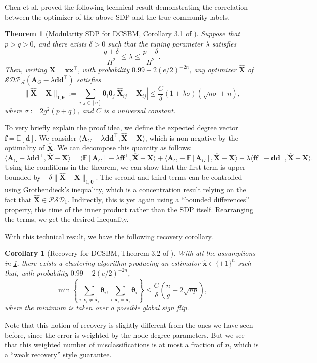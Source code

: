 \documentclass[11pt, titlepage]{article} %
\numberwithin{equation}{section}
\newtheorem{theorem}{Theorem}
\newtheorem{corollary}{Corollary}
\theoremstyle{definition}
\numberwithin{theorem}{section}
\numberwithin{lemma}{section}
\numberwithin{corollary}{section}
\numberwithin{proposition}{section}
\numberwithin{definition}{section}
\numberwithin{remark}{section}
\begin{document}
Chen et al. \cite{CLX18} proved the following technical result demonstrating the correlation between
the optimizer of the above SDP and the true community labels.
\begin{theorem}[Modularity SDP for DCSBM, Corollary 3.1 of \cite{CLX18}]
\label{thm:CLX18}
Suppose that $p > q > 0$, and there exists $\delta > 0$ such that the tuning parameter $\lambda$ satisfies
\[
\frac{q + \delta}{H^2} \leq \lambda \leq \frac{p - \delta}{H^2}.
\]
Then, writing $\bm{X} = \bm{x}\bm{x}^\top$, with probability $0.99 - 2(e/2)^{-2n}$, any optimizer 
$\hat{\bm{X}}$ of $\mathcal{SDP}_\mathcal{A}(\bm{A}_G - \lambda \bm{d}\bm{d}^\top)$ satisfies
\[
\|\hat{\bm{X}} - \bm{X}\|_{1, \bm{\theta}} := 
\sum_{i, j \in [n]}\bm{\theta}_i\bm{\theta}_j|\hat{\bm{X}}_{ij} - \bm{X}_{ij}| 
\leq \frac{C}{\delta}(1 + \lambda \sigma)(\sqrt{n\sigma}+n),
\]
where $\sigma := 2g^2(p + q)$, and $C$ is a universal constant.
\end{theorem}
To very briefly explain the proof idea, we define the expected degree vector $\bm{f} = \mathbb{E}[\bm{d}]$.
We consider $\langle \bm{A}_G - \lambda \bm{d}\bm{d}^\top, \hat{\bm{X}} - \bm{X} \rangle$, which is 
non-negative by the optimality of $\hat{\bm{X}}$. We can decompose this quantity as follows:
\[
\langle \bm{A}_G - \lambda \bm{d}\bm{d}^\top, \hat{\bm{X}} - \bm{X} \rangle
= \langle \mathbb{E}[\bm{A}_G] - \lambda \bm{f}\bm{f}^\top, \hat{\bm{X}} - \bm{X} \rangle 
+ \langle \bm{A}_G - \mathbb{E}[\bm{A}_G], \hat{\bm{X}} - \bm{X} \rangle
+ \lambda \langle \bm{f}\bm{f}^\top - \bm{d}\bm{d}^\top, \hat{\bm{X}} - \bm{X} \rangle.
\]
Using the conditions in the theorem, we can show that the first term is upper bounded by
$-\delta \|\hat{\bm{X}} - \bm{X}\|_{1, \bm{\theta}}$. The second and third terms can be controlled
using Grothendieck's inequality, which is a concentration result relying on the fact that 
$\hat{\bm{X}} \in \mathcal{PSD}_1$. Indirectly, this is yet again using a ``bounded 
differences'' property, this time of the inner product rather than the SDP itself. 
Rearranging the terms, we get the desired inequality.

With this technical result, we have the following recovery corollary.
\begin{corollary}[Recovery for DCSBM, Theorem 3.2 of \cite{CLX18}]
With all the assumptions in \cref{thm:CLX18}, there exists a clustering algorithm producing an 
estimator $\hat{\bm{x}} \in \{\pm 1\}^n$ such that, with probability $0.99 - 2(e/2)^{-2n}$,
\[
\min \left\{\sum_{i: \bm{x}_i \neq \hat{\bm{x}}_i} \bm{\theta}_i, \sum_{i: \bm{x}_i = \hat{\bm{x}}_i} \bm{\theta}_i \right\} 
\leq \frac{C}{\delta} \left(\frac{n}{g} + 2\sqrt{np}\right),
\]
where the minimum is taken over a possible global sign flip.
\end{corollary}
Note that this notion of recovery is slightly different from the ones we have seen before, since
the error is weighted by the node degree parameters. But we see that this weighted number of 
misclassifications is at most a fraction of $n$, which is a ``weak recovery'' style guarantee.
\end{document}
